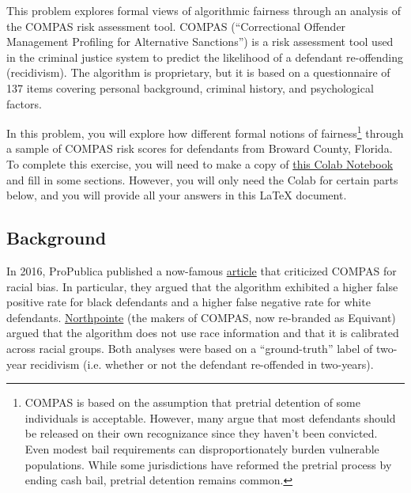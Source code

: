 \documentclass{article}
\begin{document}
This problem explores formal views of algorithmic fairness through an analysis of the COMPAS risk assessment tool. COMPAS (``Correctional Offender Management Profiling for Alternative Sanctions'') is a risk assessment tool used in the criminal justice system to predict the likelihood of a defendant re-offending (recidivism). The algorithm is proprietary, but it is based on a questionnaire of 137 items covering personal background, criminal history, and psychological factors. 

In this problem, you will explore how different formal notions of fairness\footnote{COMPAS is based on the assumption that pretrial detention of some individuals is acceptable. However, many argue that most defendants should be released on their own recognizance since they haven't been convicted. Even modest bail requirements can disproportionately burden vulnerable populations. While some jurisdictions have reformed the pretrial process by ending cash bail, pretrial detention remains common.} through a sample of COMPAS risk scores for defendants from Broward County, Florida. To complete this exercise, you will need to make a copy of \href{https://colab.research.google.com/drive/1_dyhl8robpqxn6r0JQ2D87TuZS4x1k7w?usp=sharing}{this Colab Notebook} and fill in some sections. However, you will only need the Colab for certain parts below, and you will provide all your answers in this LaTeX document. 


\subsection*{Background}

In 2016, ProPublica published a now-famous \href{https://www.propublica.org/article/machine-bias-risk-assessments-in-criminal-sentencing}{article} that criticized COMPAS for racial bias. In particular, they argued that the algorithm exhibited a higher false positive rate for black defendants and a higher false negative rate for white defendants. \href{https://www.documentcloud.org/documents/2998391-ProPublica-Commentary-Final-070616.html}{Northpointe} (the makers of COMPAS, now re-branded as Equivant) argued that the algorithm does not use race information and that it is calibrated across racial groups. Both analyses were based on a ``ground-truth'' label of two-year recidivism (i.e. whether or not the defendant re-offended in two-years).
\end{document}
